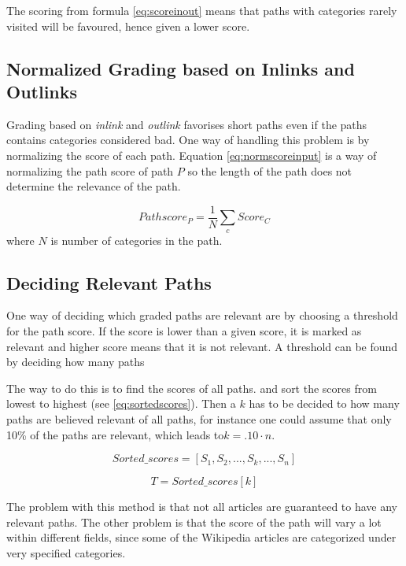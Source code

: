 The scoring from formula \ref{eq:scoreinout} means that paths with categories rarely visited will be favoured, hence given a lower score. 

\subsection{Normalized Grading based on Inlinks and Outlinks}
Grading based on \emph{inlink} and \emph{outlink} favorises short paths even if the paths contains categories considered bad. One way of handling this problem is by normalizing the score of each path. Equation \ref{eq:normscoreinput} is a way of normalizing the path score of path $P$ so the length of the path does not determine the relevance of the path. 


\begin{equation} \label{eq:normscoreinput}
Pathscore_{P} = \frac{1}{N} \sum_{c} Score_{C}
\end{equation}
where $N$ is number of categories in the path.


\subsection{Deciding Relevant Paths}
One way of deciding which graded paths are relevant are by choosing a threshold for the path score. If the score is lower than a given score, it is marked as relevant and higher score means that it is not relevant. A threshold can be found by deciding how many paths 

The way to do this is to find the scores of all paths. and sort the scores from lowest to highest (see \ref{eq:sortedscores}). Then a $k$ has to be decided to how many paths are believed relevant of all paths, for instance one could assume that only 10\% of the paths are relevant, which leads to$ k = .10 \cdot n$. 

\begin{equation} \label{eq:sortedscores}
Sorted\_scores = \left[ S_{1}, S_{2}, ... , S_{k}, ... , S_{n} \right]
\end{equation}



\begin{equation} \label{eq:threshold}
T = Sorted\_scores[k]
\end{equation}


The problem with this method is that not all articles are guaranteed to have any relevant paths. The other problem is that the score of the path will vary a lot within different fields, since some of the Wikipedia articles are categorized under very specified categories. 

